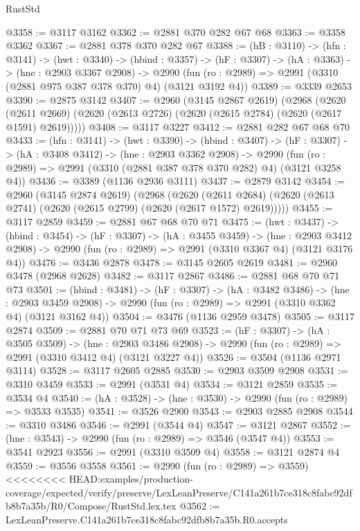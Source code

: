 \begin{lexlean}{RustStd}
\begin{coremodule}
{\begin{coremodule}
{{{{{{{@3358 := @3117 @3162
@3362 := @2881 @370 @282 @67 @68
@3363 := @3358 @3362
@3367 := @2881 @378 @370 @282 @67
@3388 := (hB : @3110) ->
  (hfn : @3141) ->
  (hwt : @3340) ->
  (hbind : @3357) ->
  (hF : @3307) ->
  (hA : @3363) ->
  (hne : @2903 @3367 @2908) ->
  @2990 (fun (ro : @2989) => @2991 (@3310 (@2881 @975 @387 @378 @370) @4) (@3121 @3192 @4))
@3389 := @3339 @2653
@3390 := @2875 @3142
@3407 := @2960
    (@3145 @2867 @2619)
    (@2968
      (@2620 (@2611 @2669) (@2620 (@2613 @2726) (@2620 (@2615 @2784) (@2620 (@2617 @1591) @2619)))))
@3408 := @3117 @3227
@3412 := @2881 @282 @67 @68 @70
@3433 := (hfn : @3141) ->
  (hwt : @3390) ->
  (hbind : @3407) ->
  (hF : @3307) ->
  (hA : @3408 @3412) ->
  (hne : @2903 @3362 @2908) ->
  @2990 (fun (ro : @2989) => @2991 (@3310 (@2881 @387 @378 @370 @282) @4) (@3121 @3258 @4))
@3436 := @3389 (@1136 @2936 @3111)
@3437 := @2879 @3142
@3454 := @2960
    (@3145 @2874 @2619)
    (@2968
      (@2620 (@2611 @2684) (@2620 (@2613 @2741) (@2620 (@2615 @2799) (@2620 (@2617 @1572) @2619)))))
@3455 := @3117 @2859
@3459 := @2881 @67 @68 @70 @71
@3475 := (hwt : @3437) ->
  (hbind : @3454) ->
  (hF : @3307) ->
  (hA : @3455 @3459) ->
  (hne : @2903 @3412 @2908) -> @2990 (fun (ro : @2989) => @2991 (@3310 @3367 @4) (@3121 @3176 @4))
@3476 := @3436 @2878
@3478 := @3145 @2605 @2619
@3481 := @2960 @3478 (@2968 @2628)
@3482 := @3117 @2867
@3486 := @2881 @68 @70 @71 @73
@3501 := (hbind : @3481) ->
  (hF : @3307) ->
  (hA : @3482 @3486) ->
  (hne : @2903 @3459 @2908) -> @2990 (fun (ro : @2989) => @2991 (@3310 @3362 @4) (@3121 @3162 @4))
@3504 := @3476 (@1136 @2959 @3478)
@3505 := @3117 @2874
@3509 := @2881 @70 @71 @73 @69
@3523 := (hF : @3307) ->
  (hA : @3505 @3509) ->
  (hne : @2903 @3486 @2908) -> @2990 (fun (ro : @2989) => @2991 (@3310 @3412 @4) (@3121 @3227 @4))
@3526 := @3504 (@1136 @2971 @3114)
@3528 := @3117 @2605 @2885
@3530 := @2903 @3509 @2908
@3531 := @3310 @3459
@3533 := @2991 (@3531 @4)
@3534 := @3121 @2859
@3535 := @3534 @4
@3540 := (hA : @3528) -> (hne : @3530) -> @2990 (fun (ro : @2989) => @3533 @3535)
@3541 := @3526 @2900
@3543 := @2903 @2885 @2908
@3544 := @3310 @3486
@3546 := @2991 (@3544 @4)
@3547 := @3121 @2867
@3552 := (hne : @3543) -> @2990 (fun (ro : @2989) => @3546 (@3547 @4))
@3553 := @3541 @2923
@3556 := @2991 (@3310 @3509 @4)
@3558 := @3121 @2874 @4
@3559 := @3556 @3558
@3561 := @2990 (fun (ro : @2989) => @3559)
<<<<<<<< HEAD:examples/production-coverage/expected/verify/preserve/LexLeanPreserve/C141a261b7ce318c8fabc92dfb8b7a35b/R0/Compose/RustStd.lex.tex
@3562 := LexLeanPreserve.C141a261b7ce318c8fabc92dfb8b7a35b.R0.accepts
}}}}}}}
\end{coremodule}}
\end{coremodule}
\end{lexlean}
